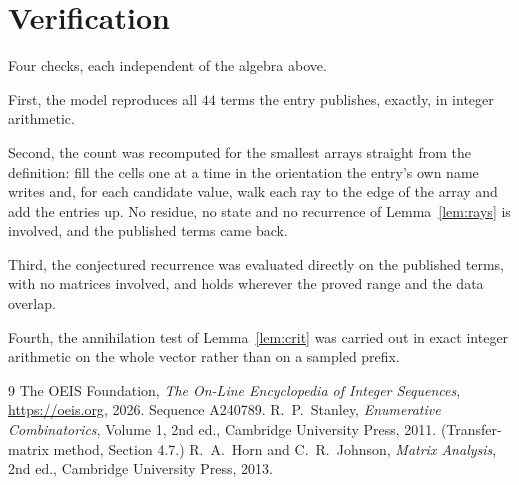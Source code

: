\documentclass[11pt,a4paper]{article}
\theoremstyle{plain}
\theoremstyle{definition}
\begin{document}
\section{Verification}

Four checks, each independent of the algebra above.

First, the model reproduces all $44$ terms the entry publishes, exactly, in integer
arithmetic.

Second, the count was recomputed for the smallest arrays straight from the definition: fill the
cells one at a time in the orientation the entry's own name writes and, for each candidate
value, walk each ray to the edge of the array and add the entries up. No residue, no state and
no recurrence of Lemma~\ref{lem:rays} is involved, and the published terms came back.

Third, the conjectured recurrence was evaluated directly on the published terms, with no
matrices involved, and holds wherever the proved range and the data overlap.

Fourth, the annihilation test of Lemma~\ref{lem:crit} was carried out in exact integer
arithmetic on the whole vector rather than on a sampled prefix.

\begin{thebibliography}{9}
 The OEIS Foundation, \emph{The On-Line Encyclopedia of Integer
Sequences}, \url{https://oeis.org}, 2026. Sequence A240789.
 R.~P.~Stanley, \emph{Enumerative Combinatorics}, Volume 1, 2nd ed.,
Cambridge University Press, 2011. (Transfer-matrix method, Section 4.7.)
 R.~A.~Horn and C.~R.~Johnson, \emph{Matrix Analysis}, 2nd ed., Cambridge
University Press, 2013.
\end{thebibliography}
\end{document}
